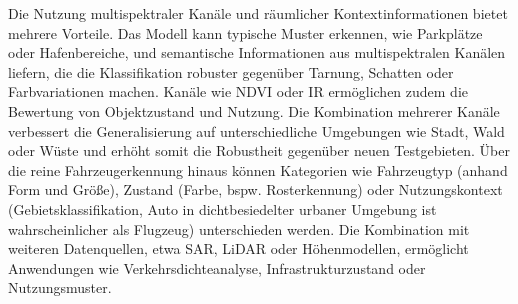 
Die Nutzung multispektraler Kanäle und räumlicher Kontextinformationen bietet mehrere Vorteile. Das Modell kann typische Muster erkennen, wie Parkplätze oder Hafenbereiche, und semantische Informationen aus multispektralen Kanälen liefern, die die Klassifikation robuster gegenüber Tarnung, Schatten oder Farbvariationen machen. Kanäle wie \acrshort{NDVI} oder \acrshort{IR} ermöglichen zudem die Bewertung von Objektzustand und Nutzung. Die Kombination mehrerer Kanäle verbessert die Generalisierung auf unterschiedliche Umgebungen wie Stadt, Wald oder Wüste und erhöht somit die Robustheit gegenüber neuen Testgebieten. Über die reine Fahrzeugerkennung hinaus können Kategorien wie Fahrzeugtyp (anhand Form und Größe), Zustand (Farbe, bspw. Rosterkennung) oder Nutzungskontext (Gebietsklassifikation, Auto in dichtbesiedelter urbaner Umgebung ist wahrscheinlicher als Flugzeug) unterschieden werden. Die Kombination mit weiteren Datenquellen, etwa \acrshort{SAR}, \acrshort{LiDAR} oder Höhenmodellen, ermöglicht Anwendungen wie Verkehrsdichteanalyse, Infrastrukturzustand oder Nutzungsmuster.



